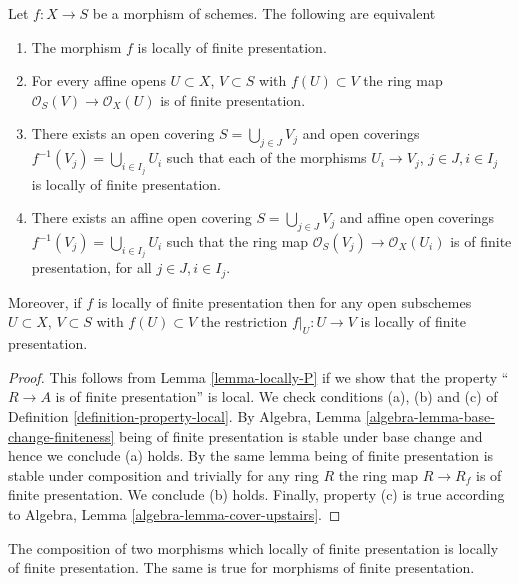 \begin{lemma}
\label{lemma-locally-finite-presentation-characterize}
Let $f : X \to S$ be a morphism of schemes.
The following are equivalent
\begin{enumerate}
\item The morphism $f$ is locally of finite presentation.
\item For every affine opens $U \subset X$, $V \subset S$
with $f(U) \subset V$ the ring map
$\mathcal{O}_S(V) \to \mathcal{O}_X(U)$ is of finite presentation.
\item There exists an open covering $S = \bigcup_{j \in J} V_j$
and open coverings $f^{-1}(V_j) = \bigcup_{i \in I_j} U_i$ such
that each of the morphisms $U_i \to V_j$, $j\in J, i\in I_j$
is locally of finite presentation.
\item There exists an affine open covering $S = \bigcup_{j \in J} V_j$
and affine open coverings $f^{-1}(V_j) = \bigcup_{i \in I_j} U_i$ such
that the ring map $\mathcal{O}_S(V_j) \to \mathcal{O}_X(U_i)$ is
of finite presentation, for all $j\in J, i\in I_j$.
\end{enumerate}
Moreover, if $f$ is locally of finite presentation then for
any open subschemes $U \subset X$, $V \subset S$ with $f(U) \subset V$
the restriction $f|_U : U \to V$ is locally of finite presentation.
\end{lemma}

\begin{proof}
This follows from Lemma \ref{lemma-locally-P} if we show that
the property ``$R \to A$ is of finite presentation'' is local.
We check conditions (a), (b) and (c) of Definition
\ref{definition-property-local}.
By Algebra, Lemma \ref{algebra-lemma-base-change-finiteness}
being of finite presentation is stable under base change and hence
we conclude (a) holds. By the same lemma being of finite presentation
is stable under composition and trivially for any ring
$R$ the ring map $R \to R_f$ is of finite presentation.
We conclude (b) holds. Finally, property (c) is true
according to Algebra, Lemma \ref{algebra-lemma-cover-upstairs}.
\end{proof}

\begin{lemma}
\label{lemma-composition-finite-presentation}
The composition of two morphisms which locally of finite presentation is
locally of finite presentation.
The same is true for morphisms of finite presentation.
\end{lemma}

